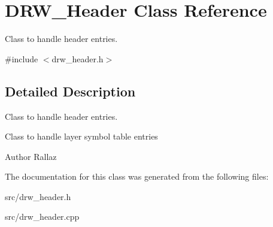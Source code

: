 \hypertarget{class_d_r_w___header}{}\section{D\+R\+W\+\_\+\+Header Class Reference}
\label{class_d_r_w___header}


Class to handle header entries.  




{\ttfamily \#include $<$drw\+\_\+header.\+h$>$}



\subsection{Detailed Description}
Class to handle header entries. 

Class to handle layer symbol table entries \begin{DoxyAuthor}{Author}
Rallaz 
\end{DoxyAuthor}


The documentation for this class was generated from the following files\+:\begin{DoxyCompactItemize}
\item 
src/drw\+\_\+header.\+h\item 
src/drw\+\_\+header.\+cpp\end{DoxyCompactItemize}
